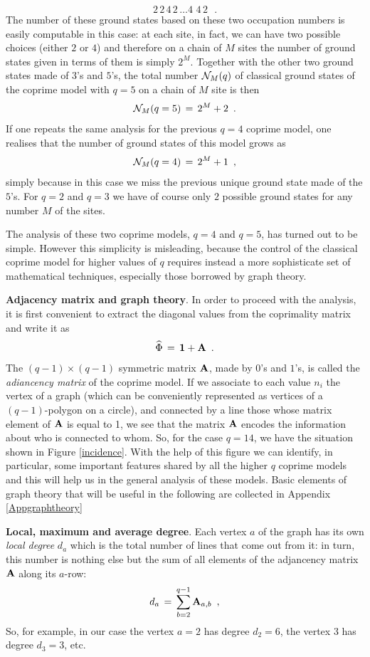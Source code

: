 \documentclass[aps,pra,superscriptaddress]{revtex4}
\newcommand\be            {\begin{equation}}
\newcommand\ee            {\end{equation}}
\renewcommand{\(}{\left(}
\renewcommand{\)}{\right)}
\renewcommand{\[}{\left[}
\renewcommand{\]}{\right]}
\begin{document}
\be 
2 \, 2\, 4\, 2\, \ldots 4\,\,4 \, 2\,\,\,\,.
\ee
The number of these ground states based on these two occupation numbers is easily computable in this case: at each site, 
in fact, we can have two possible choices (either $2$ or $4$) and therefore on a chain of $M$ sites the number of ground states given 
in terms of them is simply $2^M$. Together with the other two ground states made of $3$'s and $5$'s, the total number ${\cal N}_M(q)$ 
of classical ground states of the coprime model with $q=5$ on a chain of $M$ site is then 
\be 
{\cal N}_M(q=5) \,=\, 2^M + 2 \,\,\,. 
\label{q=5}
\ee 
If one repeats the same analysis for the previous $q=4$ coprime model, one realises that the number of ground states of this model grows as 
\be
{\cal N}_M (q=4) \,=\, 2^M +1 \,\,\,, 
\ee
simply because in this case we miss the previous unique ground state made of the $5$'s. For $q=2$ and $q=3$ we have of course only 
$2$ possible ground states for any number $M$ of the sites. 

The analysis of these two coprime models, $q=4$ and $q=5$, has turned out to be simple. However this simplicity is misleading, 
because the control of the classical coprime model for higher values of $q$ requires instead a more sophisticate set of mathematical techniques, 
especially those borrowed by graph theory.  

\vspace{3mm}
\noindent
{\bf Adjacency  matrix and graph theory}. In order to proceed with the analysis, it is first convenient to extract the diagonal values from the 
coprimality matrix and write it as 
\be 
\widehat \Phi \,=\, {\bf 1} + {\bf A} \,\,\,.
\label{definitionadjacency}
\ee
The $(q-1) \times (q-1)$ symmetric matrix ${\bf A}$, made by $0$'s and $1$'s, is called the {\em adiancency matrix} of the coprime model. If we associate 
to each value $n_i$ the vertex of a graph (which can be conveniently represented as vertices of a $(q-1)$-polygon on a circle), and connected by a line 
those whose matrix element of ${\bf A}$ is equal to 1, we see that the matrix ${\bf A}$ encodes the information about who is connected to whom. 
So, for the case $q = 14$, we have the situation shown in Figure \ref{incidence}. With the help of this figure we can identify, in particular, 
some important features shared by all the higher $q$ coprime models and this will help us in the general analysis of these models.
Basic elements of graph theory that will be useful in the following are collected in Appendix  \ref{Appgraphtheory}
 
\vspace{3mm}
\noindent
{\bf Local, maximum and average degree}. Each vertex $a$ of the graph has its own {\em local degree} $d_a$ which is the total number of lines that come out from it: in turn, this number is nothing else but the sum of all elements of the adjancency matrix ${\bf A}$ along its $a$-row: 
\be
d_a \,=\,\sum_{b=2}^{q-1} {\bf A}_{a,b} \,\,\,,
\label{localdegree}
\ee
So, for example, in our case the vertex $a=2$ has degree $d_2 = 6$, the vertex $3$ has degree $d_3 = 3$, etc. 
\end{document}
